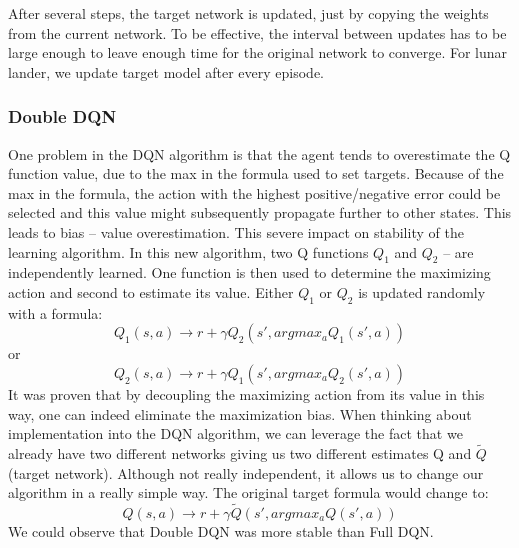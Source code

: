 After several steps, the target network is updated, just by copying the weights from the current network. To be effective, the interval between updates has to be large enough to leave enough time for the original network to converge. \newline
For lunar lander, we update target model after every episode.

\subsubsection{Double DQN}
One problem in the DQN algorithm is that the agent tends to overestimate the Q function value, due to the max in the formula used to set targets.
Because of the max in the formula, the action with the highest positive/negative error could be selected and this value might subsequently propagate further to other states. This leads to bias – value overestimation. This severe impact on stability of the learning algorithm.
\newline
In this new algorithm, two Q functions $Q_{1}$ and $Q_2$ – are independently learned. One function is then used to determine the maximizing action and second to estimate its value. Either $Q_1$ or $Q_2$ is updated randomly with a formula:
\begin{equation}
Q_1(s, a) \xrightarrow{} r + \gamma Q_2(s', argmax_a Q_1(s', a)) 
\end{equation}
or
\begin{equation}
Q_2(s, a) \xrightarrow{} r + \gamma Q_1(s', argmax_a Q_2(s', a)) 
\end{equation}
It was proven that by decoupling the maximizing action from its value in this way, one can indeed eliminate the maximization bias.
\newline
When thinking about implementation into the DQN algorithm, we can leverage the fact that we already have two different networks giving us two different estimates Q and $\tilde{Q}$ (target network). Although not really independent, it allows us to change our algorithm in a really simple way.
\newline
The original target formula would change to:
\begin{equation}
Q(s, a) \xrightarrow{} r + \gamma \tilde{Q}(s', argmax_a Q(s', a))
\end{equation}
We could observe that Double DQN was more stable than Full DQN.
 
